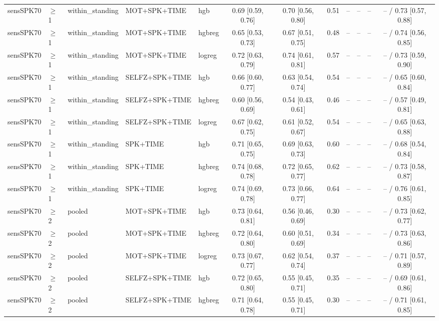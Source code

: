 \begin{longtable}{@{}lllllcccrrrc@{}}
sensSPK70 & $\geq$1 & within\_standing & MOT+SPK+TIME & hgb & 0.69 [0.59, 0.76] & 0.70 [0.56, 0.80] & 0.51 & -- & -- & -- & -- / 0.73 [0.57, 0.88] \\
sensSPK70 & $\geq$1 & within\_standing & MOT+SPK+TIME & hgbreg & 0.65 [0.53, 0.73] & 0.67 [0.51, 0.75] & 0.48 & -- & -- & -- & -- / 0.74 [0.56, 0.85] \\
sensSPK70 & $\geq$1 & within\_standing & MOT+SPK+TIME & logreg & 0.72 [0.63, 0.79] & 0.74 [0.61, 0.81] & 0.57 & -- & -- & -- & -- / 0.73 [0.59, 0.90] \\
sensSPK70 & $\geq$1 & within\_standing & SELFZ+SPK+TIME & hgb & 0.66 [0.60, 0.77] & 0.63 [0.54, 0.74] & 0.54 & -- & -- & -- & -- / 0.65 [0.60, 0.84] \\
sensSPK70 & $\geq$1 & within\_standing & SELFZ+SPK+TIME & hgbreg & 0.60 [0.56, 0.69] & 0.54 [0.43, 0.61] & 0.46 & -- & -- & -- & -- / 0.57 [0.49, 0.81] \\
sensSPK70 & $\geq$1 & within\_standing & SELFZ+SPK+TIME & logreg & 0.67 [0.62, 0.75] & 0.61 [0.52, 0.67] & 0.54 & -- & -- & -- & -- / 0.65 [0.63, 0.88] \\
sensSPK70 & $\geq$1 & within\_standing & SPK+TIME & hgb & 0.71 [0.65, 0.75] & 0.69 [0.63, 0.73] & 0.60 & -- & -- & -- & -- / 0.68 [0.54, 0.84] \\
sensSPK70 & $\geq$1 & within\_standing & SPK+TIME & hgbreg & 0.74 [0.68, 0.78] & 0.72 [0.65, 0.77] & 0.62 & -- & -- & -- & -- / 0.73 [0.58, 0.87] \\
sensSPK70 & $\geq$1 & within\_standing & SPK+TIME & logreg & 0.74 [0.69, 0.78] & 0.73 [0.66, 0.77] & 0.64 & -- & -- & -- & -- / 0.76 [0.61, 0.85] \\
sensSPK70 & $\geq$2 & pooled & MOT+SPK+TIME & hgb & 0.73 [0.64, 0.81] & 0.56 [0.46, 0.69] & 0.30 & -- & -- & -- & -- / 0.73 [0.62, 0.77] \\
sensSPK70 & $\geq$2 & pooled & MOT+SPK+TIME & hgbreg & 0.72 [0.64, 0.80] & 0.60 [0.51, 0.69] & 0.34 & -- & -- & -- & -- / 0.73 [0.63, 0.86] \\
sensSPK70 & $\geq$2 & pooled & MOT+SPK+TIME & logreg & 0.73 [0.67, 0.77] & 0.62 [0.54, 0.74] & 0.37 & -- & -- & -- & -- / 0.71 [0.57, 0.89] \\
sensSPK70 & $\geq$2 & pooled & SELFZ+SPK+TIME & hgb & 0.72 [0.65, 0.80] & 0.55 [0.45, 0.71] & 0.35 & -- & -- & -- & -- / 0.69 [0.61, 0.86] \\
sensSPK70 & $\geq$2 & pooled & SELFZ+SPK+TIME & hgbreg & 0.71 [0.64, 0.78] & 0.55 [0.45, 0.71] & 0.30 & -- & -- & -- & -- / 0.71 [0.61, 0.85] \\

\end{longtable}

